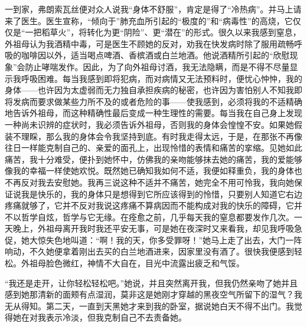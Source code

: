 \par 一到家，弗朗索瓦丝便对众人说我“身体不舒服”，肯定是得了“冷热病”。并马上请来了医生。医生宣称，“倾向于”肺充血所引起的“极度的”和“病毒性”的高烧，它仅仅是“一把稻草火”，将转化为更“阴险”、更“潜在”的形式。很久以来我感到窒息，外祖母认为我酒精中毒，可是医生不顾她的反对，劝我在快发病时除了服用疏畅呼吸的咖啡因以外，适当喝点啤酒、香槟酒或白兰地酒。他说酒精所引起的“欣慰现象”会防止哮喘发作。因此，为了向外祖母讨酒，我无法隐瞒，而是不得不尽量显示我呼吸困难。每当我感到即将犯病，而对病情又无法预料时，便忧心忡忡，我的身体——也许因为太虚弱而无力独自承担疾病的秘密，也许因为害怕别人不知我即将发病而要求做某些力所不及的或者危险的事——使我感到，必须将我的不适精确地告诉外祖母，而这种精确性最后变成一种生理性的需要。每当我在自己身上发现一种尚未识辨的症状时，我必须告诉外祖母，否则我的身体会惶惶不安。如果她假装不理睬，那么我的身体会令我坚持到底。有时我走得太远，于是，在那张不再像往日一样能克制自己的、亲爱的面孔上，出现怜惜的表情和痛苦的挛缩。见她如此痛苦，我十分难受，便扑到她怀中，仿佛我的亲吻能够抹去她的痛苦，我的爱能够像我的幸福一样使她欢悦。既然她已确知我如何不适，我便如释重负，我的身体也不再反对我去安慰她。我再三说这种不适并不痛苦，她完全不用可怜我，我向她保证说我是快乐的，我的身体只是想得到它所应该得到的怜惜，只要别人知道它右边疼痛就够了，它并不反对我说这疼痛不算病因而不能构成对我的快乐的障碍，它并不以哲学自炫，哲学与它无缘。在痊愈之前，几乎每天我的窒息都要发作几次。一天晚上，外祖母离开我时我还平安无事，可是她在夜深时又来看我，却见我呼吸急促，她大惊失色地叫道：“啊！我的天，你多受罪呀！”她马上走了出去，大门一阵响动，不久她便拿着刚出去买的白兰地酒进来，因家里没有酒了。很快我便感到轻松。外祖母脸色微红，神情不大自在，目光中流露出疲乏和气馁。
\par “我还是走开，让你轻松轻松吧。”她说，并且突然离开我，但我仍然亲吻了她并且感到她那清新的面颊有点湿润，莫非这是她刚才穿越的黑夜空气所留下的湿气？我无从得知。第二天，一直到天黑她才来到我的卧室，据说她白天不得不出门。我觉得她在对我表示冷淡，但我克制自己不去责备她。
